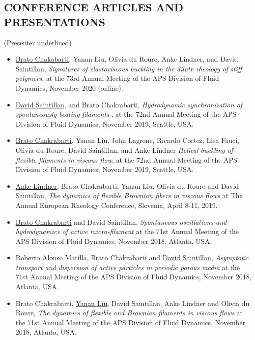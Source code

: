 \documentclass[10pt]{res} %
\begin{document}
\begin{resume}
\section{{CONFERENCE ARTICLES AND PRESENTATIONS}} 
\vspace*{1mm}
{(Presenter underlined)}
\vspace*{1mm}
\begin{itemize}
		\item \underline{Brato Chakabarti}, Yanan Liu, Olivia du Roure, Anke Lindner, and David Saintillan, \textit{Signatures of elastoviscous buckling in the dilute rheology of stiff polymers}, at the 73rd Annual Meeting of the APS Division of Fluid Dynamics, November 2020 (online).
		
		\item \underline{David Saintillan}, and Brato Chakrabarti, \textit{Hydrodynamic synchronization of spontaneously beating filaments
		}, at the 72nd Annual Meeting of the APS Division of Fluid Dynamics, November 2019, Seattle, USA.
	
		\item \underline{Brato Chakrabarti}, Yanan Liu, John Lagrone, Ricardo Cortez, Lisa Fauci, Olivia du Roure, David Saintillan, and Anke Lindner \textit{Helical buckling of flexible filaments in viscous flow},  at the 72nd Annual Meeting of the APS Division of Fluid Dynamics, November 2019, Seattle, USA.
	
	\item \underline{Anke Lindner}, Brato Chakrabarti, Yanan Liu, Olivia du Roure and David Saintillan, \textit{The dynamics of flexible Brownian fibers in viscous flows} at  The Annual European Rheology Conference, Slovenia, April 8-11, 2019.
	
	\item \underline{Brato Chakrabarti} and David Saintillan, \textit{Spontaneous oscillations and hydrodynamics of active micro-filament} at the 71st Annual Meeting of the APS Division of Fluid Dynamics, November 2018, Atlanta, USA. 
	
	\item Roberto Alonso Matilla, Brato Chakrabarti and \underline{David Saintillan}, \textit{Asymptotic transport and dispersion of active particles in periodic porous media} at the 71st Annual Meeting of the APS Division of Fluid Dynamics, November 2018, Atlanta, USA. 
	
	\item Brato Chakrabarti, \underline{Yanan Liu}, David Saintillan, Anke Lindner and Olivia du Roure, \textit{The dynamics of flexible and Brownian filaments in viscous flows} at the 71st Annual Meeting of the APS Division of Fluid Dynamics, November 2018, Atlanta, USA. 
	

\end{itemize}
\end{resume}
\end{document}
